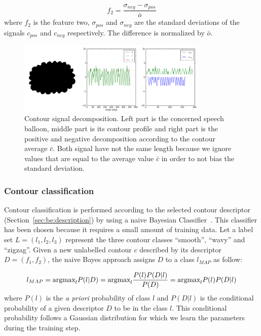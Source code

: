 \begin{equation}\label{eq:be:var_diff}
 f_2 = \frac{\sigma_{neg} - \sigma_{pos}}{\bar{o} }%
\end{equation}
where $f_2$ is the feature two, $\sigma_{pos}$ and $\sigma_{neg}$ are the standard deviations of the signals $c_{pos}$ and $c_{neg}$ respectively. The difference is normalized by $\bar{o}$.%


	\begin{figure}[!ht]	%
	  \centering
		\includegraphics[trim = 0mm 0mm 0mm 0mm, clip, width=340px]{signal_decomposition.png}
		\caption[Contour signal decomposition]{Contour signal decomposition. Left part is the concerned speech balloon, middle part is its contour profile and right part is the positive and negative decomposition according to the contour average $\bar{c}$. Both signal have not the same length because we ignore values that are equal to the average value $\bar{c}$ in order to not bias the standard deviation.}
		\label{fig:be:signal_decomposition}
	\end{figure}


\subsubsection{Contour classification}
Contour classification is performed according to the selected contour descriptor (Section~\ref{sec:be:description}) by using a naive Bayesian Classifier~\cite{Mitchell1997}.
This classifier has been chosen because it requires a small amount of training data.
Let a label set $L=(l_1,l_2,l_3)$ represent the three contour classes ``smooth'', ``wavy'' and ``zigzag''.
Given a new unlabelled contour $c$ described by its descriptor $D=(f_1,f_2)$, the naive Bayes approach assigns $D$ to a class $l_{MAP}$ as follow:

\begin{equation}\label{eq:be:fine_class}
  l_{MAP} \\
  = \mbox{argmax}_{l} P(l|D) \\
  = \mbox{argmax}_{l} \frac{P(l) P(D | l)}{P(D)}\\
  = \mbox{argmax}_{l} P(l) P(D | l)
\end{equation}
where $P(l)$ is the \textit{a priori} probability of class $l$ and $P(D|l)$ is the conditional probability of a given descriptor $D$ to be in the class $l$. This conditional probability follows a Gaussian distribution for which we learn the parameters during the training step.


